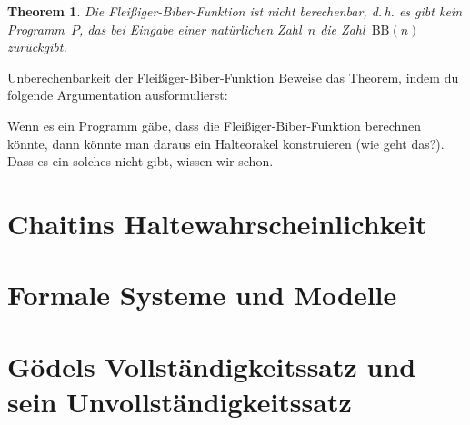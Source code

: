 \documentclass[twoside]{../zirkelblatt1415}
\theoremstyle{definition}
\theoremstyle{plain}
\newtheorem{thm}[defn]{Theorem}
\theoremstyle{remark}
\newcommand{\BB}{\mathrm{BB}}
\begin{document}
\begin{thm}Die Fleißiger-Biber-Funktion ist nicht berechenbar, d.\,h. es gibt
kein Programm~$P$, das bei Eingabe einer natürlichen Zahl~$n$ die Zahl~$\BB(n)$
zurückgibt.\end{thm}

\begin{aufgabeShaded}{Unberechenbarkeit der Fleißiger-Biber-Funktion}
Beweise das Theorem, indem du folgende Argumentation ausformulierst:

Wenn es ein Programm gäbe, dass die Fleißiger-Biber-Funktion
berechnen könnte, dann könnte man daraus ein Halteorakel konstruieren (wie geht
das?). Dass es ein solches nicht gibt, wissen wir schon.
\end{aufgabeShaded}

\section{Chaitins Haltewahrscheinlichkeit}

\section{Formale Systeme und Modelle}

\section{Gödels Vollständigkeitssatz und sein Unvollständigkeitssatz}
\end{document}
